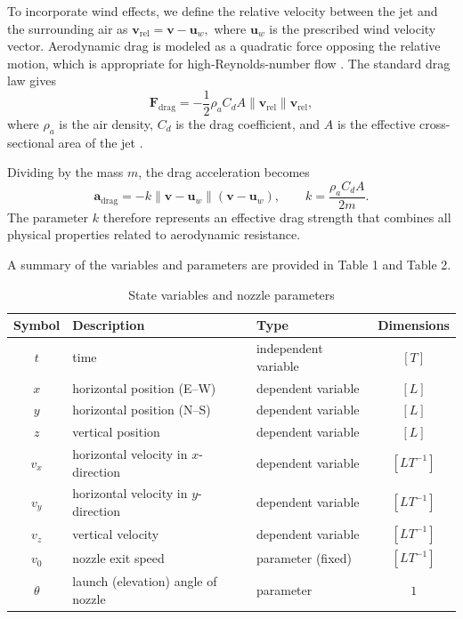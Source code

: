 \documentclass{article}
\begin{document}
To incorporate wind effects, we define the relative velocity between the jet and the surrounding air as $\mathbf{v}_{\mathrm{rel}} = \mathbf{v} - \mathbf{u}_w,$ where \(\mathbf{u}_w\) is the prescribed wind velocity vector. Aerodynamic drag is modeled as a quadratic force opposing the relative motion, which is appropriate for high-Reynolds-number flow \cite{lubarda2022review, wang2024centrifugal}. The standard drag law gives
\[
\mathbf{F}_{\text{drag}}
= - \frac{1}{2}\rho_a C_d A
\lVert \mathbf{v}_{\mathrm{rel}} \rVert
\mathbf{v}_{\mathrm{rel}},
\]
where \(\rho_a\) is the air density, \(C_d\) is the drag coefficient, and \(A\) is the effective cross-sectional area of the jet \cite{LumenDragForces}.

Dividing by the mass \(m\), the drag acceleration becomes
\[
\mathbf{a}_{\text{drag}}
= - k \lVert \mathbf{v} - \mathbf{u}_w \rVert (\mathbf{v} - \mathbf{u}_w),
\qquad
k = \frac{\rho_a C_d A}{2m}.
\]
The parameter \(k\) therefore represents an effective drag strength that combines all physical properties related to aerodynamic resistance.

A summary of the variables and parameters are provided in Table 1 and Table 2.

\begin{table}[H]
\centering
\renewcommand{\arraystretch}{1.3}
\begin{tabular}{c|l|l|c}
Symbol & Description & Type & Dimensions \\
\hline
$t$ & time & independent variable & $[T]$ \\
$x$ & horizontal position (E--W) & dependent variable & $[L]$ \\
$y$ & horizontal position (N--S) & dependent variable & $[L]$ \\
$z$ & vertical position & dependent variable & $[L]$ \\
$v_x$ & horizontal velocity in $x$-direction & dependent variable & $[LT^{-1}]$ \\
$v_y$ & horizontal velocity in $y$-direction & dependent variable & $[LT^{-1}]$ \\
$v_z$ & vertical velocity & dependent variable & $[LT^{-1}]$ \\
$v_0$ & nozzle exit speed & parameter (fixed) & $[LT^{-1}]$ \\
$\theta$ & launch (elevation) angle of nozzle & parameter & $1$ \\
\end{tabular}
\caption{State variables and nozzle parameters}
\end{table}
\end{document}
